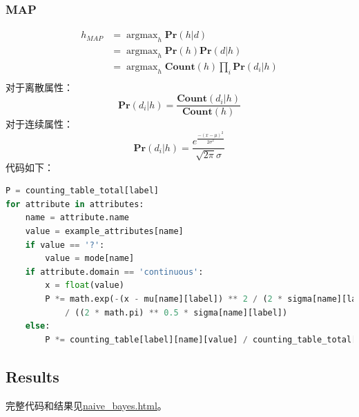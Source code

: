 \documentclass[a4paper, 11pt]{article}
\begin{document}
\subsubsection{MAP}
$$\begin{aligned}
h_{MAP}&=\mathop{\arg\max}_{h}\textbf{Pr}(h|d)\\
		&=\mathop{\arg\max}_{h}\textbf{Pr}(h)\textbf{Pr}(d|h)\\
		&=\mathop{\arg\max}_{h}\textbf{Count}(h)\prod_i\textbf{Pr}(d_i|h)\\
\end{aligned}$$
对于离散属性：
$$\textbf{Pr}(d_i|h)=\frac{\textbf{Count}(d_i|h)}{\textbf{Count}(h)}$$
对于连续属性：
$$\textbf{Pr}(d_i|h)=\frac{e^{\frac{-(x-\mu)^2}{2\sigma^2}}}{\sqrt{2\pi}\sigma}$$
代码如下：
\begin{lstlisting}[language=python]
P = counting_table_total[label]
for attribute in attributes:
	name = attribute.name
	value = example_attributes[name]
	if value == '?':
		value = mode[name]
	if attribute.domain == 'continuous':
		x = float(value)
		P *= math.exp(-(x - mu[name][label]) ** 2 / (2 * sigma[name][label] ** 2))\
			/ ((2 * math.pi) ** 0.5 * sigma[name][label])
	else:
		P *= counting_table[label][name][value] / counting_table_total[label]
\end{lstlisting}
\subsection{Results}
完整代码和结果见\href{run:naive\_bayes.html}{naive\_bayes.html}。


%
%
\end{document}
